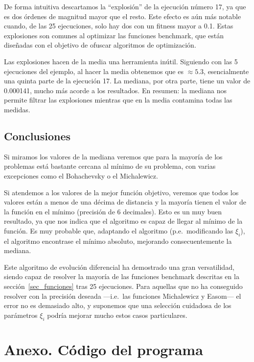 \documentclass{article}
\begin{document}
De forma intuitiva descartamos la ``explosión'' de la ejecución número 17, ya que es dos órdenes de magnitud mayor que el resto. Este efecto es aún más notable cuando, de las 25 ejecuciones, solo hay dos con un fitness mayor a 0.1. Estas explosiones son comunes al optimizar las funciones benchmark, que están diseñadas con el objetivo de ofuscar algoritmos de optimización.

Las explosiones hacen de la media una herramienta inútil. Siguiendo con las 5 ejecuciones del ejemplo, al hacer la media obtenemos que es $\approx 5.3$, esencialmente una quinta parte de la ejecución 17. La mediana, por otra parte, tiene un valor de 0.000141, mucho más acorde a los resultados. En resumen: la mediana nos permite filtrar las explosiones mientras que en la media contamina todas las medidas.

\subsection{Conclusiones}
Si miramos los valores de la mediana veremos que para la mayoría de los problemas está bastante cercana al mínimo de su problema, con varias excepciones como el Bohachevsky o el Michalewicz.

Si atendemos a los valores de la mejor función objetivo, veremos que todos los valores están a menos de una décima de distancia y la mayoría tienen el valor de la función en el mínimo (precisión de 6 decimales). Esto es un muy buen resultado, ya que nos indica que el algoritmo es capaz de llegar al mínimo de la función. Es muy probable que, adaptando el algoritmo (p.e.\ modificando las $\xi_i$), el algoritmo encontrase el mínimo absoluto, mejorando consecuentemente la mediana.
\vspace{1cm}

Este algoritmo de evolución diferencial ha demostrado una gran versatilidad, siendo capaz de resolver la mayoría de las funciones benchmark descritas en la sección~\ref{sec_funciones} tras 25 ejecuciones. Para aquellas que no ha conseguido resolver con la precisión deseada ---i.e.\ las funciones Michalewicz y Easom--- el error no es demasiado alto, y suponemos que una selección cuidadosa de los parámetros $\xi_i$ podría mejorar mucho estos casos particulares.
\vspace{5cm}

{}


\newpage

\section{Anexo. Código del programa} 
\end{document}
